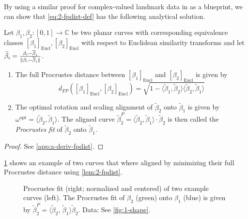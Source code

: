 \noindent By using a similar proof for complex-valued landmark data in \cite[Chap~8]{DrydenMardia2016} as a blueprint, we can show that \cref{eq:2-fpdist-def} has the following analytical solution.

\begin{lemma}
  \label{lem:2-fpdist}
  Let $\beta_1, \beta_2 : [0,1] \rightarrow \mathbb{C}$ be two planar curves with corresponding equivalence classes $[\beta_1]_\text{Eucl}, [\beta_2]_\text{Eucl}$ with respect to Euclidean similarity transforms and let $\widetilde\beta_i = \frac{\beta_i - \overline\beta_i}{\lVert\beta_i - \overline\beta_i\rVert}$.
  \begin{enumerate}[label=\emph{\roman*.)}]
    \item The full Procrustes distance between $[\beta_1]_\text{Eucl}$ and $[\beta_2]_\text{Eucl}$ is given by 
      \begin{equation}
        d_{FP}([\beta_1]_\text{Eucl},[\beta_2]_\text{Eucl}) = \sqrt{ 1 - \langle \widetilde\beta_1, \widetilde\beta_2 \rangle \langle \widetilde\beta_2, \widetilde\beta_1 \rangle }
      \end{equation}
    \item The optimal rotation and scaling alignment of $\widetilde\beta_2$ onto $\widetilde\beta_1$ is given by $\omega^\text{opt} = \langle \widetilde\beta_2, \widetilde\beta_1 \rangle$. 
      The aligned curve $\widetilde\beta_2^{P} = \langle \widetilde\beta_2, \widetilde\beta_1 \rangle \cdot \widetilde\beta_2$ is then called the \emph{Procrustes fit} of $\widetilde\beta_2$ onto $\widetilde\beta_1$.
  \end{enumerate}
  \begin{proof}
    See \cref{app:a-deriv-fpdist}.
  \end{proof}
\end{lemma}

\noindent \cref{fig:2-pfit} shows an example of two curves that where aligned by minimizing their full Procrustes distance using \cref{lem:2-fpdist}.

\begin{figure}
  \centering
  \begin{subfigure}{.48\textwidth}
    \centering
  \end{subfigure}\hfill%
  \begin{subfigure}{.48\textwidth}
    \centering
  \end{subfigure}
  \caption{
    Procrustes fit (right; normalized and centered) of two example curves (left).
    The Procrustes fit of $\beta_2$ (green) onto $\beta_1$ (blue) is given by $\widetilde\beta_2^P = \langle \widetilde\beta_2,\, \widetilde\beta_1 \rangle \widetilde\beta_2$.
    Data: See \cref{fig:1-shape}.}
  \label{fig:2-pfit}
\end{figure}


